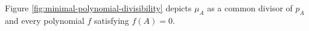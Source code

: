 Figure \ref{fig:minimal-polynomial-divisibility} depicts $\mu_A$ as a common divisor of $p_A$ and every polynomial $f$ satisfying $f(A)=0$.

\begin{illustrationfigure}[H]
  \centering
  
  \caption{$\mu_A$ is the least monic annihilator; arrows indicate that $\mu_A$ divides $p_A$ and every annihilator $f$.}
  \label{fig:minimal-polynomial-divisibility}
\end{illustrationfigure}
